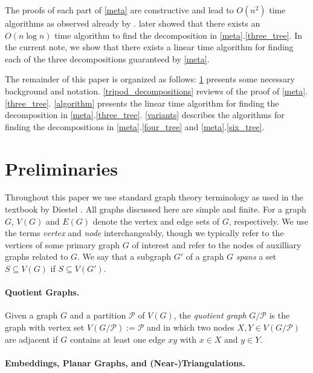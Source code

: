 \documentclass{patmorin}
\begin{document}
The proofs of each part of \cref{meta} are constructive and lead to $O(n^2)$ time algorithms as observed already by \citet{dujmovic.joret.ea:planar}.  \citet{morin:fast} later showed that there exists an $O(n\log n)$ time algorithm to find the decomposition in \cref{meta}.\ref{three_tree}.  In the current note, we show that there exists a linear time algorithm for finding each of the three decompositions guaranteed by \cref{meta}.

The remainder of this paper is organized as follows: \cref{prelims} presents some necessary background and notation.  \cref{tripod_decompositions} reviews of the proof of \cref{meta}.\ref{three_tree}.  \cref{algorithm} presents the linear time algorithm for finding the decomposition in \cref{meta}.\ref{three_tree}.  \cref{variants} describes the algorithms for finding the decompositions in \cref{meta}.\ref{four_tree} and \cref{meta}.\ref{six_tree}.

\section{Preliminaries}
\label{prelims}

Throughout this paper we use standard graph theory terminology as used in the textbook by Diestel \cite{diestel:graph}.  All graphs discussed here are simple and finite.  For a graph $G$, $V(G)$ and $E(G)$ denote the vertex and edge sets of $G$, respectively.  We use the terms \emph{vertex} and \emph{node} interchangeably, though we typically refer to the vertices of some primary graph $G$ of interest and refer to the nodes of auxilliary graphs related to $G$.  We say that a subgraph $G'$ of a graph $G$ \emph{spans} a set $S\subseteq V(G)$ if $S\subseteq V(G')$.


\paragraph{Quotient Graphs.}

Given a graph $G$ and a partition $\mathcal{P}$ of $V(G)$, the \emph{quotient graph} $G/\mathcal{P}$ is the graph with vertex set $V(G/\mathcal{P}):=\mathcal{P}$ and in which two nodes $X,Y\in V(G/\mathcal{P})$ are adjacent if $G$ contains at least one edge $xy$ with $x\in X$ and $y\in Y$.

\paragraph{Embeddings, Planar Graphs, and (Near-)Triangulations.}
\end{document}
